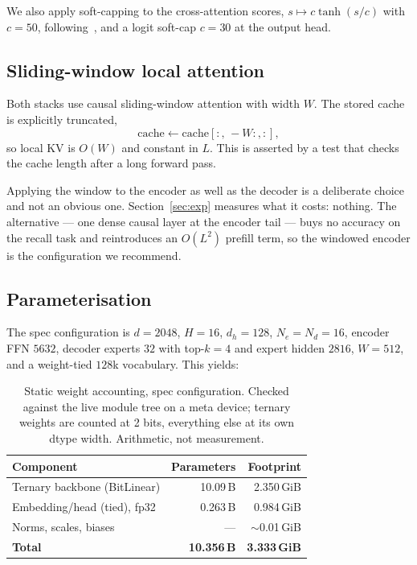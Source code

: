 \documentclass[10pt,conference]{IEEEtran}
\begin{document}
We also apply soft-capping to the cross-attention scores,
$s \mapsto c\tanh(s/c)$ with $c = 50$, following~\cite{gemma2}, and a logit soft-cap
$c=30$ at the output head.

\subsection{Sliding-window local attention}

Both stacks use causal sliding-window attention with width $W$. The stored cache is
explicitly truncated,
\begin{equation}
\text{cache} \leftarrow \text{cache}[:,\,-W\!:\!,:],
\end{equation}
so local KV is $O(W)$ and constant in $L$. This is asserted by a test that checks the
cache length after a long forward pass.

Applying the window to the encoder as well as the decoder is a deliberate choice and
not an obvious one. Section~\ref{sec:exp} measures what it costs: nothing. The
alternative --- one dense causal layer at the encoder tail --- buys no accuracy on the
recall task and reintroduces an $O(L^2)$ prefill term, so the windowed encoder is the
configuration we recommend.

\subsection{Parameterisation}

The spec configuration is $d=2048$, $H=16$, $d_h=128$, $N_e=N_d=16$, encoder FFN
$5632$, decoder experts $32$ with top-$k=4$ and expert hidden $2816$, $W=512$, and a
weight-tied $128$k vocabulary. This yields:

\begin{table}[t]
\centering
\caption{Static weight accounting, spec configuration. Checked against the live module
tree on a meta device; ternary weights are counted at 2 bits, everything else at its
own dtype width. Arithmetic, not measurement.}
\label{tab:params}
\small
\begin{tabular}{@{}lrr@{}}
\toprule
Component & Parameters & Footprint \\
\midrule
Ternary backbone (BitLinear) & 10.09\,B & 2.350\,GiB \\
Embedding/head (tied), fp32 & 0.263\,B & 0.984\,GiB \\
Norms, scales, biases & --- & $\sim$0.01\,GiB \\
\midrule
\textbf{Total} & \textbf{10.356\,B} & \textbf{3.333\,GiB} \\
\bottomrule
\end{tabular}
\end{table}
\end{document}
